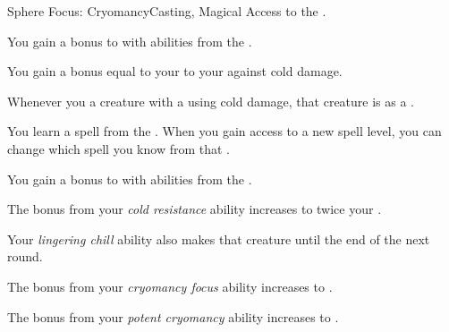     \begin{feat}{Sphere Focus: Cryomancy}{Casting, Magical}
        \featpre Access to the  .

         You gain a  bonus to  with abilities from the  .

         You gain a bonus equal to your  to your  against cold damage.

         Whenever you  a creature with a  using cold damage, that creature is  as a .

         You learn a spell from the  .
        When you gain access to a new spell level, you can change which spell you know from that .

         You gain a  bonus to  with abilities from the  .

         The bonus from your \textit{cold resistance} ability increases to twice your .

         Your \textit{lingering chill} ability also makes that creature  until the end of the next round.

         The bonus from your \textit{cryomancy focus} ability increases to .

         The bonus from your \textit{potent cryomancy} ability increases to .
    \end{feat}

